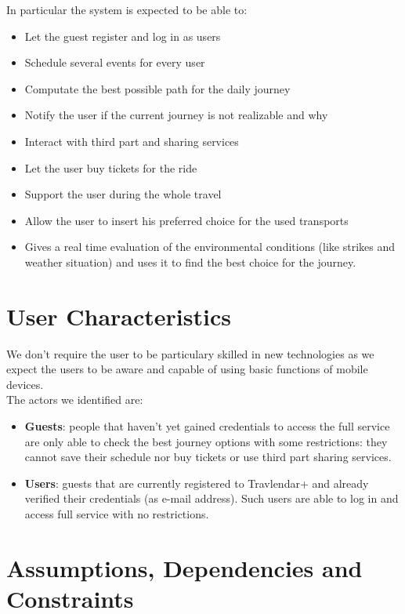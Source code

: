 \documentclass[numbers=noenddot, 12pt, a4paper, oneside]{scrbook}
\begin{document}
In particular the system is expected to be able to:
\begin{itemize}
	\item Let the guest register and log in as users
	\item Schedule several events for every user
	\item Computate the best possible path for the daily journey
	\item Notify the user if the current journey is not realizable and why
	\item Interact with third part and sharing services 
	\item Let the user buy tickets for the ride
	\item Support the user during the whole travel
	\item Allow the user to insert his preferred choice for the used transports
	\item Gives a real time evaluation of the environmental conditions (like strikes and weather situation) and uses it to find the best choice for the journey.
\end{itemize}

\section{User Characteristics}


We don't require the user to be particulary skilled in new technologies as we expect the users to be aware and capable of using basic functions of mobile devices.\\

The actors we identified are:
\begin{itemize}
	\item \textbf{Guests}: people that haven't yet gained credentials to access the full service are only able to check the best journey options with some restrictions: they cannot save their schedule nor buy tickets or use third part sharing services.
	\item \textbf{Users}: guests that are currently registered to Travlendar+ and already verified their credentials (as e-mail address). Such users are able to log in and access full service with no restrictions.
\end{itemize}
\section{Assumptions, Dependencies and Constraints\\}
\end{document}

